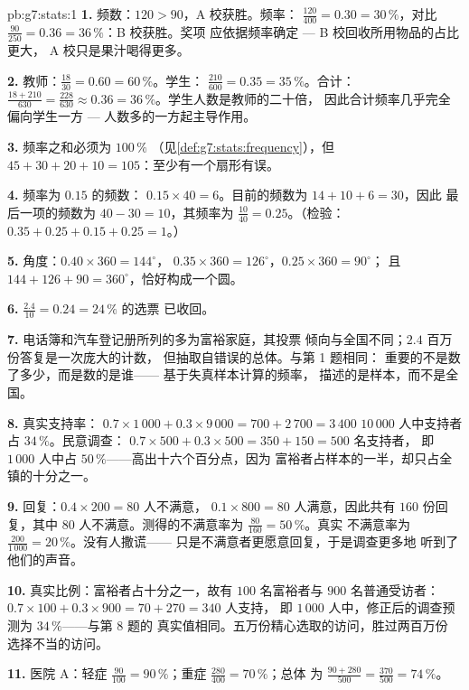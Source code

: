 \begin{solution}{pb:g7:stats:1}
\textbf{1.} 频数：$120 > 90$，A 校获胜。频率：
$\frac{120}{400} = 0.30 = 30\,\%$，对比
$\frac{90}{250} = 0.36 = 36\,\%$：B 校获胜。奖项
应依据频率确定 --- B 校回收所用物品的占比更大，
A 校只是果汁喝得更多。

\textbf{2.} 教师：$\frac{18}{30} = 0.60 = 60\,\%$。学生：
$\frac{210}{600} = 0.35 = 35\,\%$。合计：
$\frac{18 + 210}{630} = \frac{228}{630} \approx 0.36 =
36\,\%$。学生人数是教师的二十倍，
因此合计频率几乎完全偏向学生一方 ---
人数多的一方起主导作用。

\textbf{3.} 频率之和必须为 $100\,\%$
（见\cref{def:g7:stats:frequency}），但
$45 + 30 + 20 + 10 = 105$：至少有一个扇形有误。

\textbf{4.} 频率为 $0.15$ 的频数：
$0.15 \times 40 = 6$。目前的频数为 $14 + 10 + 6 = 30$，因此
最后一项的频数为 $40 - 30 = 10$，其频率为
$\frac{10}{40} = 0.25$。（检验：$0.35 + 0.25 + 0.15 + 0.25 =
1$。）

\textbf{5.} 角度：$0.40 \times 360 = 144^\circ$，
$0.35 \times 360 = 126^\circ$，$0.25 \times 360 = 90^\circ$；
且 $144 + 126 + 90 = 360^\circ$，恰好构成一个圆。

\textbf{6.} $\frac{2.4}{10} = 0.24 = 24\,\%$ 的选票
已收回。

\textbf{7.} 电话簿和汽车登记册所列的多为富裕家庭，其投票
倾向与全国不同；$2.4$ 百万份答复是一次庞大的计数，
但抽取自错误的总体。与第 1 题相同：
重要的不是数了多少，而是数的是谁——
基于失真样本计算的频率，
描述的是样本，而不是全国。

\textbf{8.} 真实支持率：
$0.7 \times 1\,000 + 0.3 \times 9\,000 = 700 + 2\,700 = 3\,400$
$10\,000$ 人中支持者占 $34\,\%$。民意调查：
$0.7 \times 500 + 0.3 \times 500 = 350 + 150 = 500$ 名支持者，
即 $1\,000$ 人中占 $50\,\%$——高出十六个百分点，因为
富裕者占样本的一半，却只占全镇的十分之一。

\textbf{9.} 回复：$0.4 \times 200 = 80$ 人不满意，
$0.1 \times 800 = 80$ 人满意，因此共有 $160$ 份回复，其中
$80$ 人不满意。测得的不满意率为 $\frac{80}{160} = 50\,\%$。真实
不满意率为 $\frac{200}{1\,000} = 20\,\%$。没有人撒谎——
只是不满意者更愿意回复，于是调查更多地
听到了他们的声音。

\textbf{10.} 真实比例：富裕者占十分之一，故有 $100$
名富裕者与 $900$ 名普通受访者：
$0.7 \times 100 + 0.3 \times 900 = 70 + 270 = 340$ 人支持，
即 $1\,000$ 人中，修正后的调查预测为 $34\,\%$——与第 8 题的
真实值相同。五万份精心选取的访问，胜过两百万份
选择不当的访问。

\textbf{11.} 医院 A：轻症 $\frac{90}{100} = 90\,\%$；重症
$\frac{280}{400} = 70\,\%$；总体
为 $\frac{90 + 280}{500} = \frac{370}{500} = 74\,\%$。


\end{solution}
